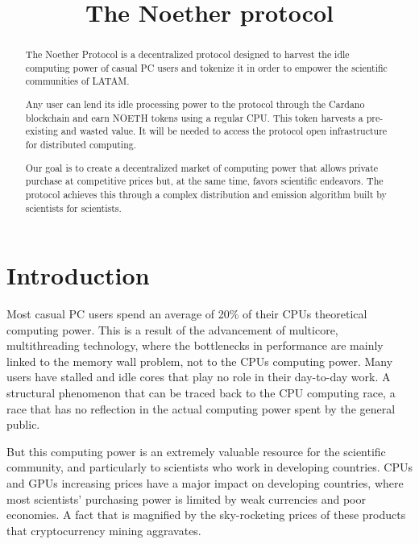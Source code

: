 \documentclass[11pt]{amsart}
\numberwithin{equation}{section}
\theoremstyle{definition}
\theoremstyle{remark}
\renewcommand{\_}[1]{_{\left( #1 \right)}}
\renewcommand{\^}[1]{^{\left( #1 \right)}}
\begin{document}
\noindent
\title[The Noether protocol]
{The Noether protocol}








\maketitle

\begin{abstract}
	The Noether Protocol is a decentralized protocol designed to harvest the idle computing power of casual PC users and tokenize it in order to empower the scientific communities of LATAM. 
	
	Any user can lend its idle processing power to the protocol through the Cardano blockchain and earn NOETH tokens using a regular CPU. This token harvests a pre-existing and wasted value. It will be needed to access the protocol open infrastructure for distributed computing. 
	
	Our goal is to create a decentralized market of computing power that allows private purchase at competitive prices but, at the same time, favors scientific endeavors. The protocol achieves this through a complex distribution and emission algorithm built by scientists for scientists. 
	
\end{abstract}
\section{Introduction}
Most casual PC users spend an average of 20\% of their CPUs theoretical computing power. This is a result of the advancement of multicore, multithreading technology, where the bottlenecks in performance are mainly linked to the memory wall problem, not to the CPUs computing power. Many users have stalled and idle cores that play no role in their day-to-day work. A structural phenomenon that can be traced back to the CPU computing race, a race that has no reflection in the actual computing power spent by the general public.

But this computing power is an extremely valuable resource for the scientific community, and particularly to scientists who work in developing countries. CPUs and GPUs increasing prices have a major impact on developing countries, where most scientists' purchasing power is limited by weak currencies and poor economies. A fact that is magnified by the sky-rocketing prices of these products that cryptocurrency mining aggravates.
\end{document}
